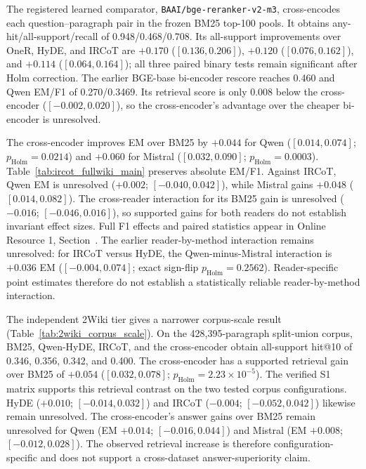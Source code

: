 The registered learned comparator, \texttt{BAAI/bge-reranker-v2-m3}, cross-encodes each question--paragraph pair in the frozen BM25 top-100 pools. It obtains any-hit/all-support/recall of 0.948/0.468/0.708. Its all-support improvements over OneR, HyDE, and IRCoT are $+0.170$ ($[0.136,0.206]$), $+0.120$ ($[0.076,0.162]$), and $+0.114$ ($[0.064,0.164]$); all three paired binary tests remain significant after Holm correction. The earlier BGE-base bi-encoder rescore reaches 0.460 and Qwen EM/F1 of 0.270/0.3469. Its retrieval score is only $0.008$ below the cross-encoder ($[-0.002,0.020]$), so the cross-encoder's advantage over the cheaper bi-encoder is unresolved.

The cross-encoder improves EM over BM25 by $+0.044$ for Qwen ($[0.014,0.074]$; $p_{\mathrm{Holm}}=0.0214$) and $+0.060$ for Mistral ($[0.032,0.090]$; $p_{\mathrm{Holm}}=0.0003$). Table~\ref{tab:ircot_fullwiki_main} preserves absolute EM/F1. Against IRCoT, Qwen EM is unresolved ($+0.002$; $[-0.040,0.042]$), while Mistral gains $+0.048$ ($[0.014,0.082]$). The cross-reader interaction for its BM25 gain is unresolved ($-0.016$; $[-0.046,0.016]$), so supported gains for both readers do not establish invariant effect sizes. Full F1 effects and paired statistics appear in Online Resource 1, Section~.
The earlier reader-by-method interaction remains unresolved: for IRCoT versus HyDE, the Qwen-minus-Mistral interaction is $+0.036$ EM ($[-0.004,0.074]$; exact sign-flip $p_{\mathrm{Holm}}=0.2562$). Reader-specific point estimates therefore do not establish a statistically reliable reader-by-method interaction.

The independent 2Wiki tier gives a narrower corpus-scale result (Table~\ref{tab:2wiki_corpus_scale}). On the 428,395-paragraph split-union corpus, BM25, Qwen-HyDE, IRCoT, and the cross-encoder obtain all-support hit@10 of 0.346, 0.356, 0.342, and 0.400. The cross-encoder has a supported retrieval gain over BM25 of $+0.054$ ($[0.032,0.078]$; $p_{\mathrm{Holm}}=2.23\times10^{-5}$). The verified S1 matrix supports this retrieval contrast on the two tested corpus configurations. HyDE ($+0.010$; $[-0.014,0.032]$) and IRCoT ($-0.004$; $[-0.052,0.042]$) likewise remain unresolved. The cross-encoder's answer gains over BM25 remain unresolved for Qwen (EM $+0.014$; $[-0.016,0.044]$) and Mistral (EM $+0.008$; $[-0.012,0.028]$). The observed retrieval increase is therefore configuration-specific and does not support a cross-dataset answer-superiority claim.

